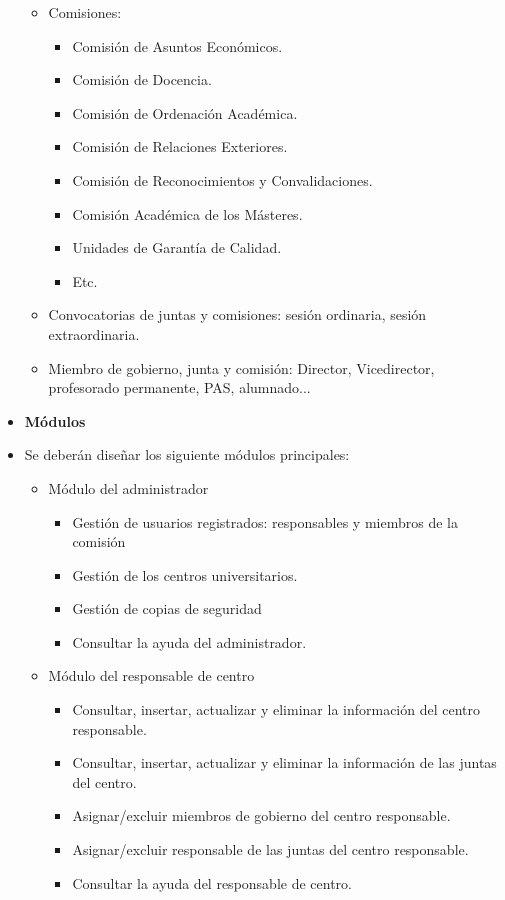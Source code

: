 \begin{itemize}
\begin{itemize}
            \item Comisiones: 
                \begin{itemize}
                    \item Comisión de Asuntos Económicos.
                    \item Comisión de Docencia.
                    \item Comisión de Ordenación Académica.
                    \item Comisión de Relaciones Exteriores.
                    \item Comisión de Reconocimientos y Convalidaciones.
                    \item Comisión Académica de los Másteres.
                    \item Unidades de Garantía de Calidad.
                    \item Etc.
                \end{itemize}
          \item Convocatorias de juntas y comisiones: sesión ordinaria, sesión extraordinaria.
          \item Miembro de gobierno, junta y comisión: Director, Vicedirector, profesorado permanente, PAS, alumnado...
      \end{itemize}
    \item \textbf{Módulos}
     \item[] Se deberán diseñar los siguiente módulos principales: 
        \begin{itemize}
            \item Módulo del administrador
                \begin{itemize}
                    \item Gestión de usuarios registrados: responsables y miembros de la comisión
                    \item Gestión de los centros universitarios.
                    \item Gestión de copias de seguridad
                    \item Consultar la ayuda del administrador.
                \end{itemize}

            \item Módulo del responsable de centro
                \begin{itemize}
                    \item Consultar, insertar, actualizar y eliminar la información del centro responsable.
                    \item Consultar, insertar, actualizar y eliminar la información de las juntas del centro.
                    \item Asignar/excluir miembros de gobierno del centro responsable.
                    \item Asignar/excluir responsable de las juntas del centro responsable.
                \item Consultar la ayuda del responsable de centro.
                \end{itemize}


\end{itemize}
\end{itemize}
